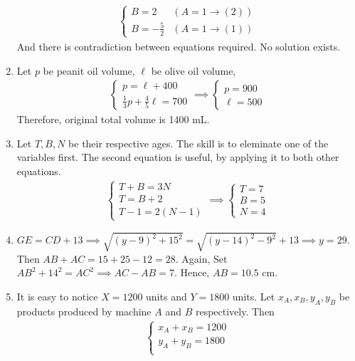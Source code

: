\documentclass[12pt]{article}
\begin{document}
\begin{enumerate}
\begin{align*}
\begin{cases}
                B=2&(A=1\to (2))\\
                B=-\frac{5}{2}&(A=1\to (1))
            \end{cases}
        \end{align*} And there is contradiction between equations required. No solution exists.
        \item Let $p$ be peanit oil volume, $\ell$ be olive oil volume, \begin{align*}
            \begin{cases}
                p=\ell+400\\
                \frac{1}{3}p+\frac{4}{5}\ell=700
            \end{cases}\implies\begin{cases}
                p=900\\
                \ell=500
            \end{cases}
        \end{align*}Therefore, original total volume is 1400 mL.
        \item Let $T,B,N$ be their respective ages. The skill is to eleminate one of the variables first. The second equation is useful, by applying it to both other equations.\begin{align*}
            \begin{cases}
                T+B=3N\\
                T=B+2\\
                T-1=2(N-1)
            \end{cases}\implies\begin{cases}
                T=7\\
                B=5\\
                N=4
            \end{cases}
        \end{align*}
        \item $GE=CD+13\implies \sqrt{(y-9)^2+15^2}=\sqrt{(y-14)^2-9^2}+13\implies y=29$. Then $AB + AC = 15 + 25 - 12 = 28$. Again, Set $AB^2+14^2=AC^2 \implies AC - AB = 7$. Hence, $AB = 10.5$ cm.
        \item It is easy to notice $X=1200$ units and $Y=1800$ units. Let $x_A,x_B,y_A,y_B$ be products produced by machine $A$ and $B$ respectively. Then \begin{align*}
            \begin{cases}
                x_A+x_B = 1200\\
                y_A+y_B = 1800\\

\end{cases}
\end{align*}
\end{enumerate}
\end{document}
